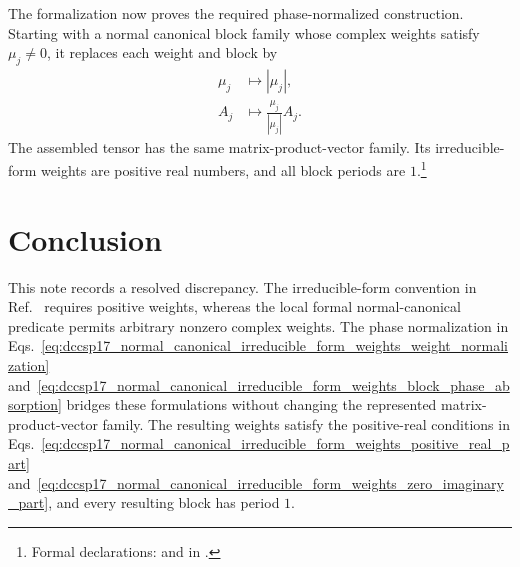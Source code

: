 \documentclass[11pt]{article}
\begin{document}
The formalization now proves the required phase-normalized construction.
Starting with a normal canonical block family whose complex weights satisfy
$\mu_j\neq0$, it replaces each weight and block by
\begin{align}
    \mu_j
        &\longmapsto |\mu_j|,
    \label{eq:dccsp17_normal_canonical_irreducible_form_weights_weight_normalization}\\
    A_j
        &\longmapsto \frac{\mu_j}{|\mu_j|}A_j.
    \label{eq:dccsp17_normal_canonical_irreducible_form_weights_block_phase_absorption}
\end{align}
The assembled tensor has the same matrix-product-vector family. Its
irreducible-form weights are positive real numbers, and all block periods are
$1$.\footnote{Formal declarations:
 and
 in
.}

\section{Conclusion}

This note records a resolved discrepancy. The irreducible-form convention in
Ref.~\cite{DeLasCuevas2017Irreducible} requires positive weights, whereas the
local formal normal-canonical predicate permits arbitrary nonzero complex
weights. The phase normalization in
Eqs.~\ref{eq:dccsp17_normal_canonical_irreducible_form_weights_weight_normalization}
and~\ref{eq:dccsp17_normal_canonical_irreducible_form_weights_block_phase_absorption}
bridges these formulations without changing the represented
matrix-product-vector family. The resulting weights satisfy the positive-real
conditions in
Eqs.~\ref{eq:dccsp17_normal_canonical_irreducible_form_weights_positive_real_part}
and~\ref{eq:dccsp17_normal_canonical_irreducible_form_weights_zero_imaginary_part},
and every resulting block has period $1$.



\end{document}
